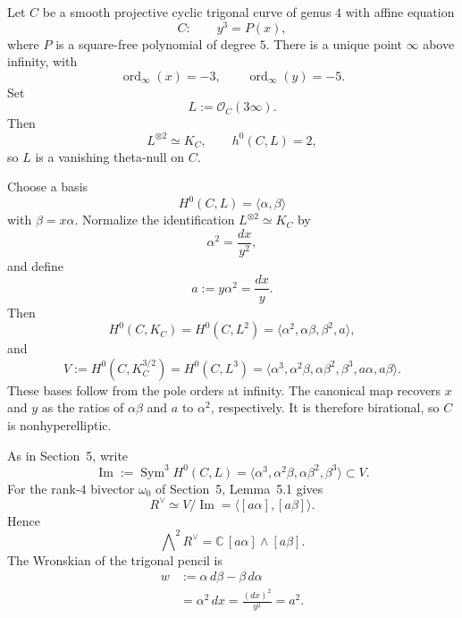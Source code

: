 \documentclass[10pt,a4paper]{amsart}
\begin{document}
Let $C$ be a smooth {projective} cyclic trigonal curve of genus $4$ {with affine equation}
\begin{equation}
\label{eq:cyclic-trigonal}
C:\qquad y^3=P(x),
\end{equation}
where $P$ is a square-free polynomial of degree $5$.  There is a unique point $\infty$ above infinity, with
\begin{equation*}
\operatorname{ord}_{\infty}(x)=-3,
\qquad
\operatorname{ord}_{\infty}(y)=-5.
\end{equation*}
Set
\begin{equation*}
L:=\mathcal O_C(3\infty).
\end{equation*}
Then
\begin{equation*}
L^{\otimes 2}\simeq K_C,
\qquad
h^0(C,L)=2,
\end{equation*}
so $L$ is a vanishing theta-null on $C$.

Choose a basis
\begin{equation*}
H^0(C,L)=\langle \alpha,\beta\rangle
\end{equation*}
with $\beta=x\alpha$.  Normalize the identification $L^{\otimes 2}\simeq K_C$ by
\begin{equation*}
\alpha^2=\frac{dx}{y^2},
\end{equation*}
and define
\begin{equation*}
a:=y\alpha^2=\frac{dx}{y}.
\end{equation*}
Then
\begin{equation}
\label{eq:cyclic-H0K}
H^0(C,K_C)
= H^0(C,L^2) =
\langle \alpha^2,\alpha\beta,\beta^2,a\rangle,
\end{equation}
and
\begin{equation}
\label{eq:cyclic-H0K32}
V:=H^0(C,K_C^{3/2})
= H^0(C,L^3) =
\langle
\alpha^3,\alpha^2\beta,\alpha\beta^2,\beta^3,
a\alpha,a\beta
\rangle.
\end{equation}
{These bases follow from the pole orders at infinity. The canonical
map recovers $x$ and $y$ as the ratios of $\alpha\beta$ and $a$ to
$\alpha^2$, respectively. It is therefore birational, so $C$ is
nonhyperelliptic.}

As in Section~5, write
\begin{equation*}
\operatorname{Im}:=\operatorname{Sym}^3H^0(C,L)
=
\langle
\alpha^3,\alpha^2\beta,\alpha\beta^2,\beta^3
\rangle
\subset V.
\end{equation*}
For the rank-$4$ bivector $\omega_0$ of Section~5, Lemma~5.1 gives
\begin{equation*}
R^\vee\simeq V/\operatorname{Im}
=
\langle [a\alpha],[a\beta]\rangle.
\end{equation*}
Hence
\begin{equation}
\label{eq:wedge-null-generator}
\bigwedge\nolimits^2R^\vee
=
\mathbb C\,[a\alpha]\wedge[a\beta].
\end{equation}
The Wronskian of the trigonal pencil is
\begin{align}
\label{eq:w-equals-a2}
w
&:=\alpha\,d\beta-\beta\,d\alpha \\
&=\alpha^2\,dx
=\frac{(dx)^2}{y^2}
=a^2.
\end{align}
\end{document}
